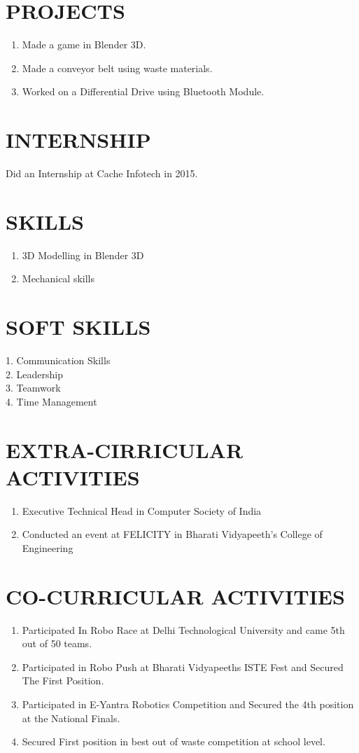 \documentclass{article}
\begin{document}
\section{PROJECTS}
\Large
\begin{enumerate}
\item Made a game in Blender 3D. 
\item Made a conveyor belt using waste materials.
\item Worked on a Differential Drive using Bluetooth Module.
\end{enumerate}

\section{INTERNSHIP}
Did an Internship at Cache Infotech in 2015.

\section{SKILLS}
\begin{enumerate}
\item 3D Modelling in Blender 3D
\item Mechanical skills
\end{enumerate}

\section{SOFT SKILLS}
1. Communication Skills\\
2. Leadership\\
3. Teamwork\\
4. Time Management\\

\section{EXTRA-CIRRICULAR ACTIVITIES}
\begin{enumerate}
\item Executive Technical Head in Computer Society of India
\item Conducted an event at FELICITY in Bharati Vidyapeeth's College of Engineering
\end{enumerate}

\section{CO-CURRICULAR ACTIVITIES}
\begin{enumerate}
\item Participated In Robo Race at Delhi Technological University and came 5th out of 50 teams.
\item Participated in Robo Push at Bharati Vidyapeeths ISTE Fest and Secured The First Position.
\item Participated in E-Yantra Robotics Competition and Secured the 4th position at the National Finals.
\item Secured First position in best out of waste competition at school level.
\end{enumerate}
\end{document}
